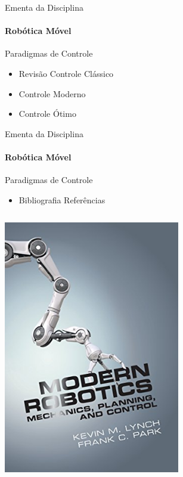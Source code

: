\documentclass{beamer}
\begin{document}
 
\begin{frame}[t]{Ementa da Disciplina}
	\framesubtitle{Robótica Móvel}
	\begin{block}{Paradigmas de Controle}
	\end{block}
	\begin{itemize}
		\item Revisão Controle Clássico
		\item Controle Moderno
		\item Controle Ótimo
	\end{itemize}
\end{frame}


\begin{frame}[c]{Ementa da Disciplina}
	\framesubtitle{Robótica Móvel}
	\begin{block}{Paradigmas de Controle}
	\end{block}
	\begin{itemize}
		\item Bibliografia Referências
	\end{itemize}
	\begin{columns}[c]
		\begin{column}{0.5\textwidth}
			\center
			\includegraphics[width=0.7\textwidth]{./images/livro3}
		\end{column}
		\begin{column}{0.5\textwidth}

\end{column}
\end{columns}
\end{frame}
\end{document}
